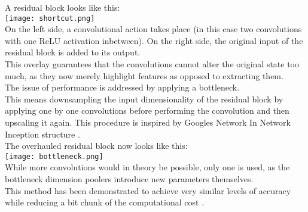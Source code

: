 A residual block looks like this: \\
\texttt{[image: shortcut.png]}\\
On the left side, a convolutional action takes place (in this case two convolutions with one ReLU activation inbetween). On the right side, the original input of the residual block is added to its output.\\
This overlay guarantees that the convolutions cannot alter the original state too much, as they now merely highlight features as opposed to extracting them.\\
The issue of performance is addressed by applying a bottleneck.\\
This means downsampling the input dimensionality of the residual block by applying one by one convolutions before performing the convolution and then upscaling it again. This procedure is inspired by Googles Network In Network Inception structure \cite{KaimingHe2015} \cite{Lin2014}.\\
The overhauled residual block now looks like this:\\
\texttt{[image: bottleneck.png]}\\
While more convolutions would in theory be possible, only one is used, as the bottleneck dimension poolers introduce new parameters themselves.\\
This method has been demonstrated to achieve very similar levels of accuracy while reducing a bit chunk of the computational cost \cite{KaimingHe2015}.\\
